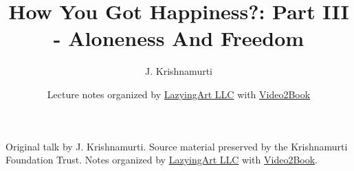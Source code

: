 \documentclass[11pt,oneside]{book}
\begin{document}
\frontmatter
\title{How You Got Happiness?: Part III - Aloneness And Freedom}
\author{J. Krishnamurti}
\date{Lecture notes organized by \href{https://lazying.art}{LazyingArt LLC} with \href{https://github.com/lachlanchen/Video2Book}{Video2Book}}
\maketitle
\begin{center}
\small Original talk by J. Krishnamurti. Source material preserved by the Krishnamurti Foundation Trust. Notes organized by \href{https://lazying.art}{LazyingArt LLC} with \href{https://github.com/lachlanchen/Video2Book}{Video2Book}.
\end{center}
\clearpage
\mainmatter

\end{document}
